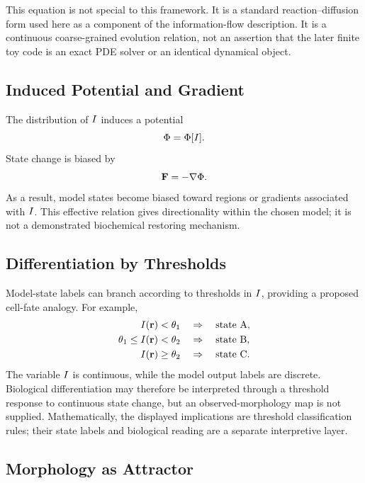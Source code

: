This equation is not special to this framework. It is a standard reaction--diffusion form used here as a component of the information-flow description. It is a continuous coarse-grained evolution relation, not an assertion that the later finite toy code is an exact PDE solver or an identical dynamical object.

\subsection{Induced Potential and Gradient}

The distribution of \(I\) induces a potential
\begin{equation}
  \Phi = \Phi[I].
\end{equation}
State change is biased by
\begin{equation}
  \mathbf{F} = -\nabla \Phi.
\end{equation}
As a result, model states become biased toward regions or gradients associated with \(I\). This effective relation gives directionality within the chosen model; it is not a demonstrated biochemical restoring mechanism.

\subsection{Differentiation by Thresholds}

Model-state labels can branch according to thresholds in \(I\), providing a proposed cell-fate analogy. For example,
\begin{align}
  I(\mathbf{r}) < \theta_1
  &\quad \Rightarrow \quad \text{state A},\\
  \theta_1 \leq I(\mathbf{r}) < \theta_2
  &\quad \Rightarrow \quad \text{state B},\\
  I(\mathbf{r}) \geq \theta_2
  &\quad \Rightarrow \quad \text{state C}.
\end{align}
The variable \(I\) is continuous, while the model output labels are discrete. Biological differentiation may therefore be interpreted through a threshold response to continuous state change, but an observed-morphology map is not supplied.
Mathematically, the displayed implications are threshold classification rules; their state labels and biological reading are a separate interpretive layer.

\subsection{Morphology as Attractor}

